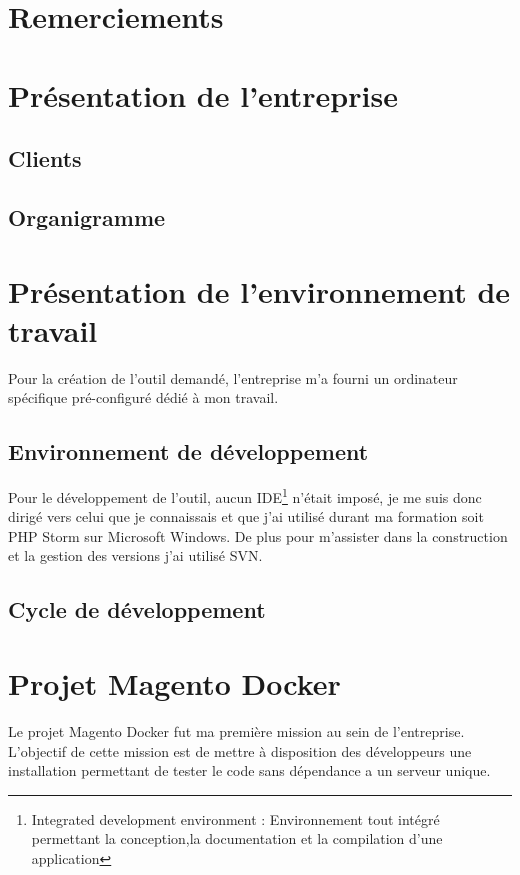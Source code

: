 \documentclass{Article}
\begin{document}
\clearpage
\newpage\null\thispagestyle{empty}\newpage

\tableofcontents

\section{Remerciements}
\section{Présentation de l'entreprise}
	\subsection{Clients}
	\subsection{Organigramme}
\section{Présentation de l'environnement de travail}

	Pour la création de l'outil demandé, l'entreprise m'a fourni un ordinateur spécifique pré-configuré
dédié à mon travail.

	\subsection{Environnement de développement}

	Pour le développement de l'outil, aucun IDE\footnote{Integrated development environment : Environnement tout intégré permettant la conception,la documentation et la compilation d'une application} n'était imposé, je me suis donc dirigé vers celui que je connaissais et que j'ai utilisé durant ma formation soit PHP Storm sur Microsoft Windows. De plus pour m'assister dans la construction et la gestion des versions j'ai utilisé SVN.

	\subsection{Cycle de développement}


\section{Projet Magento Docker}

	Le projet Magento Docker fut ma première mission au sein de l'entreprise. L'objectif de cette mission est de mettre à disposition des développeurs une installation permettant de tester le code sans dépendance a un serveur unique.
\end{document}
